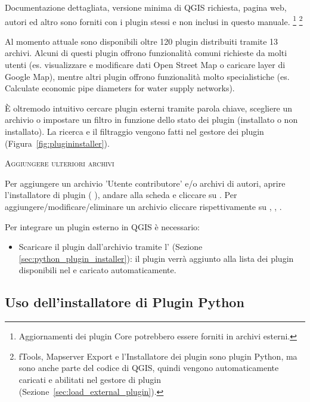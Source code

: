 Documentazione dettagliata, versione minima di QGIS richiesta, pagina web, autori ed 
altro sono forniti con i plugin stessi e non inclusi in questo manuale.
\footnote{Aggiornamenti dei plugin Core potrebbero essere forniti in archivi esterni.}
\footnote{fTools, Mapserver Export e l'Installatore dei plugin sono plugin Python, ma 
sono anche parte del codice di QGIS, quindi vengono automaticamente caricati e abilitati 
nel gestore di plugin (Sezione~\ref{sec:load_external_plugin}).}

Al momento attuale sono disponibili oltre 120 plugin distribuiti tramite 13 archivi.
Alcuni di questi plugin offrono funzionalità comuni richieste da molti utenti 
(es. visualizzare e modificare dati Open Street Map 
o caricare layer di Google Map), mentre altri plugin offrono funzionalità molto 
specialistiche (es. Calculate economic pipe diameters for water supply networks).

È oltremodo intuitivo cercare plugin esterni tramite parola chiave, scegliere un 
archivio o impostare un filtro in funzione dello stato dei plugin (installato 
o non installato). La ricerca e il filtraggio vengono fatti nel gestore dei plugin 
(Figura~\ref{fig:plugininstaller}).

\begin{Tip} \caption{\textsc{Aggiungere ulteriori archivi}}
Per aggiungere un archivio 'Utente contributore' e/o archivi di autori, aprire 
l'installatore di plugin ( \arrow {}),
andare alla scheda  e cliccare su .
Per aggiungere/modificare/eliminare un archivio cliccare rispettivamente su , 
, .
\end{Tip}

Per integrare un plugin esterno in QGIS è necessario:

\begin{itemize}[label=--]
\item Scaricare il plugin dall'archivio tramite l' 
(Sezione \ref{sec:python_plugin_installer}): il plugin verrà aggiunto alla lista
dei plugin disponibili nel  e caricato automaticamente.
\end{itemize}

\subsection{Uso dell'installatore di Plugin Python}\label{sec:python_plugin_installer}

